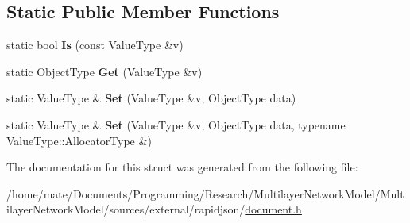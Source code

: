 \subsection*{Static Public Member Functions}
\begin{DoxyCompactItemize}
\item 
static bool {\bfseries Is} (const Value\+Type \&v)\hypertarget{structinternal_1_1TypeHelper_3_01ValueType_00_01typename_01ValueType_1_1Object_01_4_a6c8bcb7479d2c4c96ae6dcaac808e227}{}\label{structinternal_1_1TypeHelper_3_01ValueType_00_01typename_01ValueType_1_1Object_01_4_a6c8bcb7479d2c4c96ae6dcaac808e227}

\item 
static Object\+Type {\bfseries Get} (Value\+Type \&v)\hypertarget{structinternal_1_1TypeHelper_3_01ValueType_00_01typename_01ValueType_1_1Object_01_4_ae1debd6b9c125d4206e43a74ddbd0795}{}\label{structinternal_1_1TypeHelper_3_01ValueType_00_01typename_01ValueType_1_1Object_01_4_ae1debd6b9c125d4206e43a74ddbd0795}

\item 
static Value\+Type \& {\bfseries Set} (Value\+Type \&v, Object\+Type data)\hypertarget{structinternal_1_1TypeHelper_3_01ValueType_00_01typename_01ValueType_1_1Object_01_4_a7655ed9b6c7443d99063ec20769b9984}{}\label{structinternal_1_1TypeHelper_3_01ValueType_00_01typename_01ValueType_1_1Object_01_4_a7655ed9b6c7443d99063ec20769b9984}

\item 
static Value\+Type \& {\bfseries Set} (Value\+Type \&v, Object\+Type data, typename Value\+Type\+::\+Allocator\+Type \&)\hypertarget{structinternal_1_1TypeHelper_3_01ValueType_00_01typename_01ValueType_1_1Object_01_4_a41825b964c6188a07539b7ab2e6ed194}{}\label{structinternal_1_1TypeHelper_3_01ValueType_00_01typename_01ValueType_1_1Object_01_4_a41825b964c6188a07539b7ab2e6ed194}

\end{DoxyCompactItemize}


The documentation for this struct was generated from the following file\+:\begin{DoxyCompactItemize}
\item 
/home/mate/\+Documents/\+Programming/\+Research/\+Multilayer\+Network\+Model/\+Multilayer\+Network\+Model/sources/external/rapidjson/\hyperlink{document_8h}{document.\+h}\end{DoxyCompactItemize}
